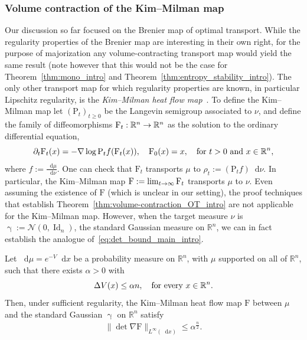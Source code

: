 \documentclass[AHL,Unicode,longabstracts]{cedram}
\newcommand{\R}{\mathbb R}
\DeclareMathOperator{\Id}{Id}
\newcommand{\Pheat}{\mathrm{P}}
\newcommand{\KM}{\mathrm F}
\newcommand{\V}{V}
\newcommand{\dd}{n}
\newcommand{\density}{f}
\newcommand{\prob}{\rho}
\newcommand{\source}{\mu}
\newcommand{\target}{\nu}
\newcommand{\lsh}{\alpha}
\newcommand*\diff{\mathop{}\!\mathrm{d}}
\newcommand{\clN}{\mathcal{N}}
\newcommand{\Gaussian}{\upgamma}
\renewcommand*{\to}{\mathchoice{\longrightarrow}{\rightarrow}{\rightarrow}{\rightarrow}}
\let\oldin\in
\renewcommand{\in}{\mathchoice{\oldin}{\oldin}{\,\oldin\,}{\,\oldin\,}}
\begin{document}
\subsubsection{Volume contraction of the Kim--Milman map} Our discussion so far focused on the Brenier map of optimal transport. While the regularity properties of the Brenier map are interesting in their own right, for the purpose of majorization any volume-contracting transport map would yield the same result (note however that this would not be the case for Theorem~\ref{thm:mono_intro} and Theorem~\ref{thm:entropy_stability_intro}). The only other transport map for which regularity properties are known, in particular Lipschitz regularity, is the \emph{Kim--Milman heat flow map}~\cite{MR2983070}. To define the Kim--Milman map let $(\Pheat_t)_{t\ge 0}$ be the Langevin semigroup associated to $\target$, and define the family of diffeomorphisms $\KM_t:\R^{\dd}\to\R^{\dd}$ as the solution to the ordinary differential equation,
\begin{equation}\label{eq:KM_construction_intro}
\partial_t\KM_t(x)=-\nabla\log\Pheat_t\density(\KM_t(x)),\quad \KM_0(x)=x,\quad \text{for}~t>0 \text{ and } x\in\R^{\dd},
\end{equation}
where $\density:=\frac{\diff\source}{\diff\target}$. One can check that $\KM_t$ transports $\source$ to $\prob_t:=(\Pheat_t \density)\diff\target$. In particular, the Kim--Milman map $\KM:=\lim_{t\to\infty}\KM_t$ transports $\source$ to $\target$. Even assuming the existence of $\KM$ (which is unclear in our setting), the proof techniques that establish Theorem~\ref{thm:volume-contraction_OT_intro} are not applicable for the Kim--Milman map. However, when the target measure $\target$ is $\Gaussian:=\clN(0,\Id_{\dd})$, the standard Gaussian measure on $\R^{\dd}$, we can in fact establish the analogue of~\eqref{eq:det_bound_main_intro}.

\begin{theo}[Informal]\label{thm:majorization_KM_intro}
Let $\diff\source=e^{-\V}\diff x$ be a probability measure on $\R^{\dd}$, with $\source$ supported on all of $\R^{\dd}$, such that there exists $\lsh>0$ with
\[
\Delta \V(x) \le \lsh\dd, \quad\textnormal{for every $x\in\R^{\dd}$}.
\]
Then, under sufficient regularity, the Kim--Milman heat flow map $\KM$ between $\source$ and the standard Gaussian $\Gaussian$ on $\R^{\dd}$ satisfy
\begin{align}\label{eq:det_bound_KM_intro}
\|\!\det\nabla \KM\|_{L^{\infty}(\diff x)}\le \lsh^{\frac{\dd}{2}}.
\end{align}
\end{theo}
\end{document}
